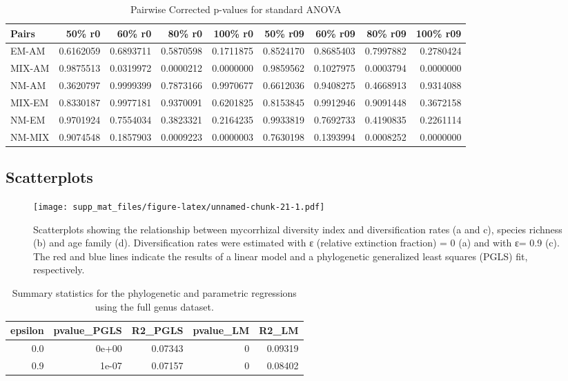 \documentclass[]{article}
\begin{document}
\begin{table}[H]

\caption{\label{tab:unnamed-chunk-20}Pairwise Corrected p-values for standard ANOVA}
\centering
\begin{tabular}{l|r|r|r|r|r|r|r|r}
\hline
Pairs & 50\% r0 & 60\% r0 & 80\% r0 & 100\% r0 & 50\% r09 & 60\% r09 & 80\% r09 & 100\% r09\\
\hline
EM-AM & 0.6162059 & 0.6893711 & 0.5870598 & 0.1711875 & 0.8524170 & 0.8685403 & 0.7997882 & 0.2780424\\
\hline
MIX-AM & 0.9875513 & 0.0319972 & 0.0000212 & 0.0000000 & 0.9859562 & 0.1027975 & 0.0003794 & 0.0000000\\
\hline
NM-AM & 0.3620797 & 0.9999399 & 0.7873166 & 0.9970677 & 0.6612036 & 0.9408275 & 0.4668913 & 0.9314088\\
\hline
MIX-EM & 0.8330187 & 0.9977181 & 0.9370091 & 0.6201825 & 0.8153845 & 0.9912946 & 0.9091448 & 0.3672158\\
\hline
NM-EM & 0.9701924 & 0.7554034 & 0.3823321 & 0.2164235 & 0.9933819 & 0.7692733 & 0.4190835 & 0.2261114\\
\hline
NM-MIX & 0.9074548 & 0.1857903 & 0.0009223 & 0.0000003 & 0.7630198 & 0.1393994 & 0.0008252 & 0.0000000\\
\hline
\end{tabular}
\end{table}

\hypertarget{scatterplots}{%
\subsection{Scatterplots}\label{scatterplots}}

\begin{figure}
\centering
\texttt{[image: supp\_mat\_files/figure-latex/unnamed-chunk-21-1.pdf]}
\caption{Scatterplots showing the relationship between mycorrhizal
diversity index and diversification rates (a and c), species richness
(b) and age family (d). Diversification rates were estimated with ε
(relative extinction fraction) = 0 (a) and with ε= 0.9 (c). The red and
blue lines indicate the results of a linear model and a phylogenetic
generalized least squares (PGLS) fit, respectively.}
\end{figure}

\begin{longtable}{r|r|r|r|r}
\caption{\label{tab:unnamed-chunk-22}Summary statistics for the phylogenetic and parametric regressions using the full genus dataset.}\\
\hline
epsilon & pvalue\_PGLS & R2\_PGLS & pvalue\_LM & R2\_LM\\
\hline
0.0 & 0e+00 & 0.07343 & 0 & 0.09319\\
\hline
0.9 & 1e-07 & 0.07157 & 0 & 0.08402\\
\hline
\end{longtable}
\end{document}
